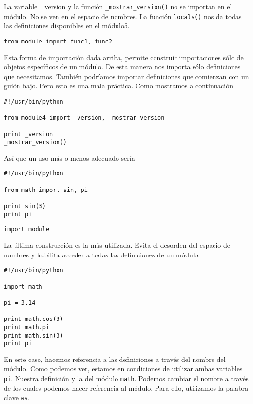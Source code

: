 \documentclass[twoside,10.5pt]{article}%
\begin{document}
La variable \_version y la funci\'on \texttt{\_mostrar\_version()} no se importan en el m\'odulo. No se ven  en el espacio de nombres. La función \texttt{locals()} nos da todas las definiciones disponibles en el m\'odulo5.

\vspace{0.3cm}

\begin{verbatim}
from module import func1, func2...
\end{verbatim}

Esta forma de importaci\'on  dada arriba, permite construir  importaciones s\'olo de  objetos espec\'ificos de un m\'odulo. De esta manera nos importa s\'olo definiciones que necesitamos. Tambi\'en podr\'iamos importar definiciones  que comienzan con un gui\'on bajo. Pero esto es una mala pr\'actica. Como mostramos a continuaci\'on


\begin{verbatim}
#!/usr/bin/python

from module4 import _version, _mostrar_version

print _version
_mostrar_version()
\end{verbatim}

As\'i que un uso m\'as o menos adecuado ser\'ia


 
\begin{verbatim}
#!/usr/bin/python

from math import sin, pi

print sin(3)
print pi
\end{verbatim}

\vspace{0.3cm}
 

\begin{verbatim}
import module
\end{verbatim}


La \'ultima construcci\'on es la  m\'as utilizada. Evita el desorden del espacio de nombres y habilita acceder a todas las definiciones de un m\'odulo.

\begin{verbatim}
#!/usr/bin/python

import math

pi = 3.14

print math.cos(3)
print math.pi
print math.sin(3)
print pi
\end{verbatim}

En este caso, hacemos referencia a las definiciones a trav\'es del nombre del m\'odulo. Como podemos ver, estamos en condiciones de utilizar ambas variables \texttt{pi}. Nuestra definici\'on y la del m\'odulo \texttt{math}. Podemos cambiar el nombre a trav\'es de los cuales podemos hacer referencia al m\'odulo. Para ello, utilizamos la palabra clave \texttt{as}.
\end{document}
